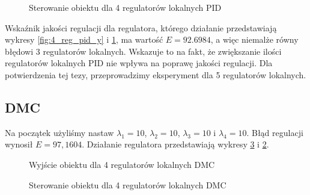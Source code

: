 \begin{figure}[H]
\centering
{}
\caption{Sterowanie obiektu dla 4 regulatorów lokalnych PID}
\label{fig:4_reg_pid_u}
\end{figure}

Wskaźnik jakości regulacji dla regulatora, którego działanie przedstawiają wykresy \ref{fig:4_reg_pid_y} i \ref{fig:4_reg_pid_u}, ma wartość $E=92.6984$, a więc niemalże równy błędowi 3 regulatorów lokalnych. Wskazuje to na fakt, że zwiększanie ilości regulatorów lokalnych PID nie wpływa na poprawę jakości regulacji. Dla potwierdzenia tej tezy, przeprowadzimy eksperyment dla 5 regulatorów lokalnych.

\subsection{DMC}
Na początek użyliśmy nastaw $\lambda_1=10$, $\lambda_2=10$, $\lambda_3=10$ i $\lambda_4=10$. Błąd regulacji wynosił $E=97,1604$. Działanie regulatora przedstawiają wykresy \ref{fig:41_reg_dmc_u} i \ref{fig:41_reg_dmc_y}.

\begin{figure}[H]
\centering
{}
\caption{Wyjście obiektu dla 4 regulatorów lokalnych DMC}
\label{fig:41_reg_dmc_y}
\end{figure}

\begin{figure}[H]
\centering
{}
\caption{Sterowanie obiektu dla 4 regulatorów lokalnych DMC}
\label{fig:41_reg_dmc_u}
\end{figure}

